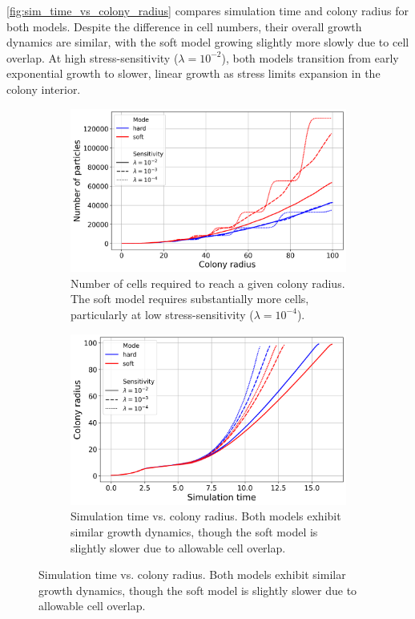 \documentclass[conference]{IEEEtran}
\begin{document}
\autoref{fig:sim_time_vs_colony_radius} compares simulation time and colony radius for both models. Despite the difference in cell numbers, their overall growth dynamics are similar, with the soft model growing slightly more slowly due to cell overlap. At high stress-sensitivity ($\lambda = 10^{-2}$), both models transition from early exponential growth to slower, linear growth as stress limits expansion in the colony interior.

\begin{figure}[h]
    \centering
    \begin{subfigure}[b]{\linewidth}
        \centering
        \includegraphics[width=\linewidth]{figures/comparison_plots/combined_colony_radius_vs_num_particles.png}
        \caption{Number of cells required to reach a given colony radius. The soft model requires substantially more cells, particularly at low stress-sensitivity ($\lambda = 10^{-4}$).}
        \label{fig:colony_radius_vs_num_cells}
    \end{subfigure}

    \begin{subfigure}[b]{\linewidth}
        \centering
        \includegraphics[width=\linewidth]{figures/comparison_plots/combined_simulation_time_vs_colony_radius.png}
        \caption{Simulation time vs. colony radius. Both models exhibit similar growth dynamics, though the soft model is slightly slower due to allowable cell overlap.}
        \label{fig:sim_time_vs_colony_radius}
    \end{subfigure}


\end{figure}
\end{document}
